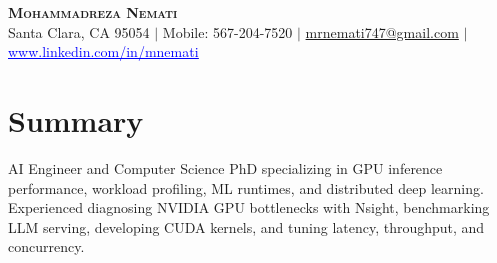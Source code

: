 \documentclass[letterpaper,13pt]{article}
\begin{document}
\begin{center}
    \textbf{\LARGE \scshape Mohammadreza Nemati} \\ \vspace{1pt}
    \small Santa Clara, CA 95054 $|$ Mobile: 567-204-7520 $|$
    \href{mailto:mrnemati747@gmail.com}{mrnemati747@gmail.com} $|$
    \href{https://www.linkedin.com/in/mnemati/}{\textcolor{blue}{\underline{www.linkedin.com/in/mnemati}}}
\end{center}

\section{Summary}
\small{AI Engineer and Computer Science PhD specializing in GPU inference performance, workload profiling, ML runtimes, and distributed deep learning. Experienced diagnosing NVIDIA GPU bottlenecks with Nsight, benchmarking LLM serving, developing CUDA kernels, and tuning latency, throughput, and concurrency.}
\vspace{0.05cm}
\end{document}
